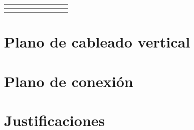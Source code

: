 \begin{table}[h]
{\begin{tabular}{|l|l|l|l|llll}
                                       &                                    &                                 &                     & \multicolumn{1}{l|}{}                  & \multicolumn{1}{l|}{}                       & \multicolumn{1}{l|}{}                       & \multicolumn{1}{l|}{}                   \\ \hline
                                       &                                    &                                 &                     & \multicolumn{1}{l|}{}                  & \multicolumn{1}{l|}{}                       & \multicolumn{1}{l|}{}                       & \multicolumn{1}{l|}{}                   \\ \hline
\end{tabular}%
}
\end{table}
\section{Plano de cableado vertical}
\section{Plano de conexión}
\section{Justificaciones}